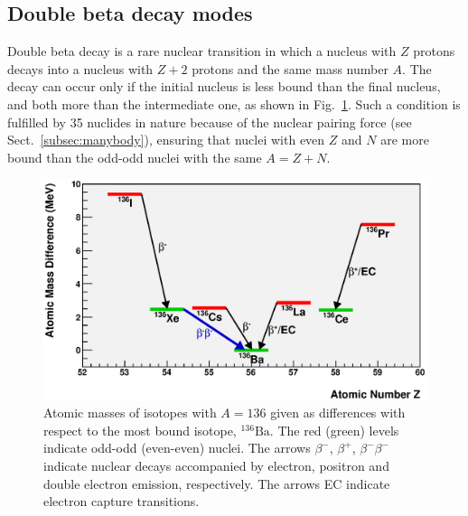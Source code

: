 \subsection{Double beta decay modes} \label{subsec:bbmodes}
%
Double beta decay is a rare nuclear transition in which a nucleus with $Z$ protons decays into a nucleus with $Z+2$ protons and the same mass number $A$. The decay can occur only if the initial nucleus is less bound than the final nucleus, and both more than the intermediate one, as shown in Fig.~\ref{fig:atomicmasses_a136}. Such a condition is fulfilled by 35 nuclides in nature because of the nuclear pairing force (see Sect.~\ref{subsec:manybody}), ensuring that nuclei with even $Z$ and $N$ are more bound than the odd-odd nuclei with the same $A=Z+N$.

\begin{figure}[tb]
\centering
\includegraphics[width=\textwidth]{img/atomicmasses_a136.eps}
\caption{Atomic masses of isotopes with $A=136$ given as differences with respect to the most bound isotope, $^{136}\text{Ba}$. The red (green) levels indicate odd-odd (even-even) nuclei. The arrows $\beta^-$, $\beta^+$, $\beta^-\beta^-$ indicate nuclear decays accompanied by electron, positron and double electron emission, respectively. The arrows EC indicate electron capture transitions.} \label{fig:atomicmasses_a136}
\end{figure}

